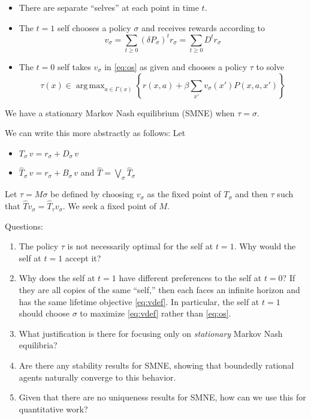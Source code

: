 \documentclass[12pt, reqno]{amsart}
\renewcommand{\geq}{\geqslant}
\DeclareMathOperator*{\argmax}{arg\,max}
\newcommand{\1}{\mathbbm 1}
\theoremstyle{plain}
\theoremstyle{definition}
\begin{document}
\begin{itemize}
    \item There are separate ``selves'' at each point in time $t$.  
    \item The $t=1$ self chooses a policy $\sigma$ and receives rewards
        according to
        \begin{equation}\label{eq:os}
            v_\sigma 
            = \sum_{t \geq 0} (\delta P_\sigma)^t r_\sigma
            = \sum_{t \geq 0} D^t r_\sigma
        \end{equation}
    \item The $t=0$ self takes $v_\sigma$ in \eqref{eq:os} as given and chooses a policy
        $\tau$ to solve
        \begin{equation*}
            \tau(x) \in \argmax_{a \in \Gamma(x)}
            \left\{
                r(x, a) + \beta \sum_{x'} v_\sigma(x') P(x, a, x')
            \right\}
        \end{equation*}
\end{itemize}

We have a stationary Markov Nash equilibrium (SMNE) when $\tau = \sigma$.

We can write this more abstractly as follows:  Let
%
\begin{itemize}
    \item $T_\sigma \, v = r_\sigma + D_\sigma \, v$ 
    \item $\hat T_\sigma \, v = r_\sigma + B_\sigma \, v$ and $\hat T = \bigvee_\sigma
        \hat T_\sigma$ 
\end{itemize}
%
Let $\tau = M \sigma$ be defined by choosing $v_\sigma$ as the fixed point of
$T_\sigma$ and then $\tau$ such that $\hat T v_\sigma = \hat T_\tau v_\sigma$.
We seek a fixed point of $M$.

Questions:
%
\begin{enumerate}
    \item The policy $\tau$ is not necessarily optimal for the self at $t=1$.
        Why would the self at $t=1$ accept it?
    \item Why does the self at $t=1$ have different preferences to the self at
        $t=0$?  If they are all copies of the same ``self,'' then each faces an
        infinite horizon and has the same lifetime objective \eqref{eq:vdef}.
        In particular, the self at $t=1$ should choose $\sigma$ to maximize
        \eqref{eq:vdef} rather than \eqref{eq:os}.
    \item What justification is there for focusing only on \emph{stationary} Markov Nash equilibria?  
    \item Are there any stability results for SMNE, showing that boundedly
        rational agents naturally converge to this behavior.
    \item Given that there are no uniqueness results for SMNE, how can we use
        this for quantitative work?
\end{enumerate}



%
%
\end{document}
